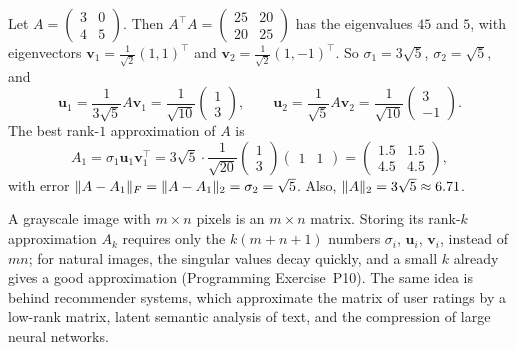 \begin{example}\label{L2-ex:low-rank}
    Let $A = \begin{pmatrix} 3 & 0 \\ 4 & 5 \end{pmatrix}$. Then $A^\top A = \begin{pmatrix} 25 & 20 \\ 20 & 25 \end{pmatrix}$ has the eigenvalues $45$ and $5$, with eigenvectors $\mathbf{v}_1 = \frac{1}{\sqrt{2}}(1, 1)^\top$ and $\mathbf{v}_2 = \frac{1}{\sqrt{2}}(1, -1)^\top$. So $\sigma_1 = 3\sqrt{5}$, $\sigma_2 = \sqrt{5}$, and
    \[\mathbf{u}_1 = \frac{1}{3\sqrt{5}} A \mathbf{v}_1 = \frac{1}{\sqrt{10}} \begin{pmatrix} 1 \\ 3 \end{pmatrix}, \qquad \mathbf{u}_2 = \frac{1}{\sqrt{5}} A \mathbf{v}_2 = \frac{1}{\sqrt{10}} \begin{pmatrix} 3 \\ -1 \end{pmatrix}.\]
    The best rank-$1$ approximation of $A$ is
    \[A_1 = \sigma_1 \mathbf{u}_1 \mathbf{v}_1^\top = 3\sqrt{5} \cdot \frac{1}{\sqrt{20}} \begin{pmatrix} 1 \\ 3 \end{pmatrix} \begin{pmatrix} 1 & 1 \end{pmatrix} = \begin{pmatrix} 1.5 & 1.5 \\ 4.5 & 4.5 \end{pmatrix},\]
    with error $\lVert A - A_1 \rVert_F = \lVert A - A_1 \rVert_2 = \sigma_2 = \sqrt{5}$. Also, $\lVert A \rVert_2 = 3\sqrt{5} \approx 6.71$.
\end{example}

\begin{remark}
    A grayscale image with $m \times n$ pixels is an $m \times n$ matrix. Storing its rank-$k$ approximation $A_k$ requires only the $k(m + n + 1)$ numbers $\sigma_i$, $\mathbf{u}_i$, $\mathbf{v}_i$, instead of $mn$; for natural images, the singular values decay quickly, and a small $k$ already gives a good approximation (Programming Exercise~P10). The same idea is behind recommender systems, which approximate the matrix of user ratings by a low-rank matrix, latent semantic analysis of text, and the compression of large neural networks.
\end{remark}

